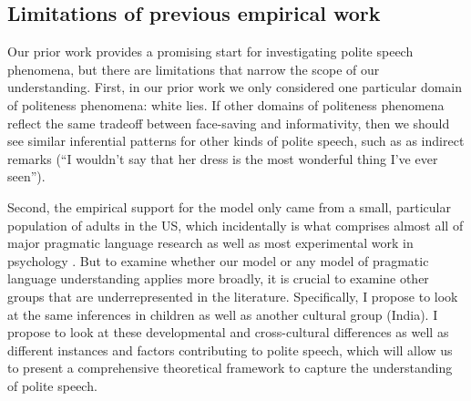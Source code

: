 \subsection{Limitations of previous empirical work}

Our prior work provides a promising start for investigating polite speech phenomena, but there are limitations that narrow the scope of our understanding. First, in our prior work we only considered one particular domain of politeness phenomena: white lies. If other domains of politeness phenomena reflect the same tradeoff between face-saving and informativity, then we should see similar inferential patterns for other kinds of polite speech, such as as indirect remarks (``I wouldn't say that her dress is the most wonderful thing I've ever seen''). 

Second, the empirical support for the model only came from a small, particular population of adults in the US, which incidentally is what comprises almost all of major pragmatic language research as well as most experimental work in psychology \citep{henrich2010}. But to examine whether our model or any model of pragmatic language understanding applies more broadly, it is crucial to examine other groups that are underrepresented in the literature. Specifically, I propose to look at the same inferences in children as well as another cultural group (India). I propose to look at these developmental and cross-cultural differences as well as different instances and factors contributing to polite speech, which will allow us to present a comprehensive theoretical framework to capture the understanding of polite speech.

